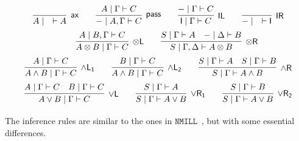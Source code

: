 \documentclass[submission,copyright,creativecommons]{eptcs}
\theoremstyle{definition}
\newcommand{\tl}{\otimes \mathsf{L}}
\newcommand{\tr}{\otimes \mathsf{R}}
\newcommand{\pass}{\mathsf{pass}}
\newcommand{\unitl}{\mathsf{IL}}
\newcommand{\unitr}{\mathsf{IR}}
\newcommand{\andlone}{\land \mathsf{L_{1}}}
\newcommand{\andltwo}{\land \mathsf{L_{2}}}
\newcommand{\andr}{\land \mathsf{R}}
\newcommand{\orl}{\lor \mathsf{L}}
\newcommand{\orrone}{\lor \mathsf{R_{1}}}
\newcommand{\orrtwo}{\lor \mathsf{R_{2}}}
\newcommand{\ax}{\mathsf{ax}}
\newcommand{\ot}{\otimes}
\newcommand{\I}{\mathsf{I}}
\newcommand{\NMILL}{$\mathtt{NMILL}$}
\begin{document}
\begin{equation}\label{eq:seqcalc}
  \def\arraystretch{2.5}
  \begin{array}{c}
    \infer[\ax]{A \mid \quad \vdash A}{}
    \qquad
    \infer[\pass]{{-} \mid A , \Gamma \vdash C}{A \mid \Gamma \vdash C}
    \qquad
    \infer[\unitl]{\I \mid \Gamma \vdash C}{{-} \mid \Gamma \vdash C}
    \qquad
    \infer[\unitr]{{-} \mid \quad \vdash \I}{}
    \\
    \qquad
    \infer[\tl]{A \ot B \mid \Gamma \vdash C}{A \mid B , \Gamma \vdash C}
    \qquad
    \infer[\tr]{S \mid \Gamma , \Delta \vdash A \ot B}{
      S \mid \Gamma \vdash A
      &
      {-} \mid \Delta \vdash B
    }
    \\
    \infer[\andlone]{A \land B \mid \Gamma \vdash C}{A \mid \Gamma \vdash C}
    \qquad
    \infer[\andltwo]{A \land B \mid \Gamma \vdash C}{B \mid \Gamma \vdash C}
    \qquad
    \infer[\andr]{S \mid \Gamma \vdash A \land B}{
      S \mid \Gamma \vdash A
      &
      S \mid \Gamma \vdash B
    }
    \\
    \infer[\orl]{A \lor B \mid \Gamma \vdash C}{
      A \mid \Gamma \vdash C
      &
      B \mid \Gamma \vdash C
    }
    \qquad
    \infer[\orrone]{S \mid \Gamma \vdash A \lor B}{S \mid \Gamma \vdash A}
    \qquad
    \infer[\orrtwo]{S \mid \Gamma \vdash A \lor B}{S \mid \Gamma \vdash B}
  \end{array}
\end{equation}
The inference rules are similar to the ones in \NMILL \ \cite{abrusci:noncommutative:1990}, but with some essential differences. 
\end{document}

